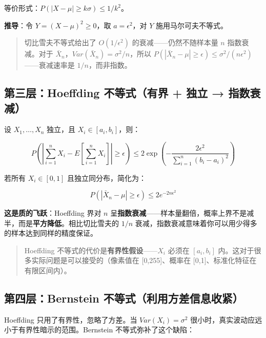\documentclass[
]{book}
\begin{document}
等价形式：\(P(|X - \mu| \geq k\sigma) \leq 1/k^2\)。

\textbf{推导}：令 \(Y = (X - \mu)^2 \geq 0\)，取 \(a = \epsilon^2\)，对 \(Y\) 施用马尔可夫不等式。

\begin{quote}
切比雪夫不等式给出了 \(O(1/\epsilon^2)\) 的衰减------仍然不随样本量 \(n\) 指数衰减。对于 \(\bar{X}_n\)，\(Var(\bar{X}_n) = \sigma^2/n\)，所以 \(P(|\bar{X}_n - \mu| \geq \epsilon) \leq \sigma^2/(n\epsilon^2)\)------衰减速率是 \(1/n\)，而非指数。
\end{quote}

\subsection{第三层：Hoeffding 不等式（有界 + 独立 → 指数衰减）}\label{ux7b2cux4e09ux5c42hoeffding-ux4e0dux7b49ux5f0fux6709ux754c-ux72ecux7acb-ux6307ux6570ux8870ux51cf}

设 \(X_1, \ldots, X_n\) 独立，且 \(X_i \in [a_i, b_i]\)，则：

\[P\left(\left|\sum_{i=1}^n X_i - E\left[\sum_{i=1}^n X_i\right]\right| \geq \epsilon\right) \leq 2\exp\left(-\frac{2\epsilon^2}{\sum_{i=1}^n (b_i - a_i)^2}\right)\]

若所有 \(X_i \in [0, 1]\) 且独立同分布，简化为：

\[P(|\bar{X}_n - \mu| \geq \epsilon) \leq 2e^{-2n\epsilon^2}\]

\textbf{这是质的飞跃}：Hoeffding 界对 \(n\) 呈\textbf{指数衰减}------样本量翻倍，概率上界不是减半，而是\textbf{平方降低}。相比切比雪夫的 \(1/n\) 衰减，指数衰减意味着你可以用少得多的样本达到同样的精度保证。

\begin{quote}
Hoeffding 不等式的代价是\textbf{有界性假设}------\(X_i\) 必须在 \([a_i, b_i]\) 内。这对于很多实际问题是可以接受的（像素值在 {[}0,255{]}、概率在 {[}0,1{]}、标准化特征在有限区间内）。
\end{quote}

\subsection{第四层：Bernstein 不等式（利用方差信息收紧）}\label{ux7b2cux56dbux5c42bernstein-ux4e0dux7b49ux5f0fux5229ux7528ux65b9ux5deeux4fe1ux606fux6536ux7d27}

Hoeffding 只用了有界性，忽略了方差。当 \(Var(X_i) = \sigma^2\) 很小时，真实波动应远小于有界性暗示的范围。Bernstein 不等式弥补了这个缺陷：
\end{document}

